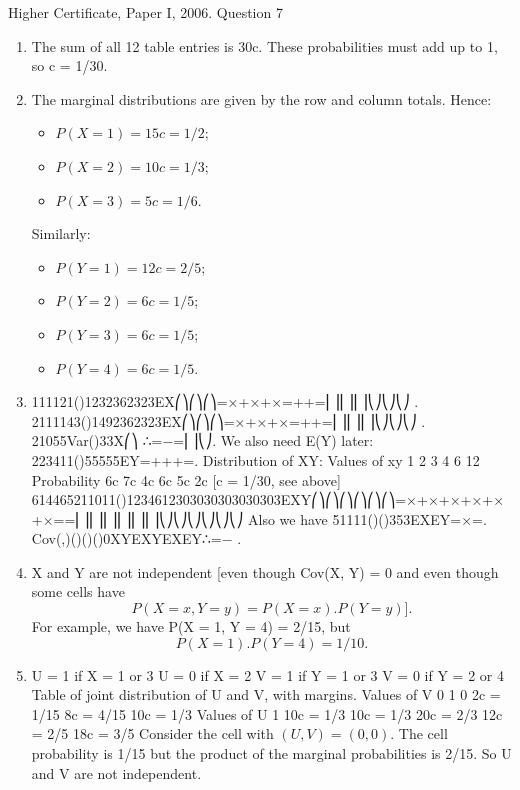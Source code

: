 \documentclass[a4paper,12pt]{article}
\begin{document}
Higher Certificate, Paper I, 2006. Question 7
\begin{enumerate}
\item  The sum of all 12 table entries is 30c. These probabilities must add up to 1, so c = 1/30.
\item  The marginal distributions are given by the row and column totals.
Hence:  
\begin{itemize}
\item $P(X = 1) = 15c = 1/2$; 
\item $P(X = 2) = 10c = 1/3$; 
\item $P(X = 3) = 5c = 1/6$.
\end{itemize}
Similarly: 
\begin{itemize}
\item $P(Y = 1) = 12c = 2/5$; 
\item $P(Y = 2) = 6c = 1/5$; 
\item $P(Y = 3) = 6c = 1/5$; 
\item $P(Y = 4) = 6c = 1/5$.
\end{itemize}
\item 111121()1232362323EX⎛⎞⎛⎞⎛⎞=×+×+×=++=⎜⎟⎜⎟⎜⎟⎝⎠⎝⎠⎝⎠ .
2111143()1492362323EX⎛⎞⎛⎞⎛⎞=×+×+×=++=⎜⎟⎜⎟⎜⎟⎝⎠⎝⎠⎝⎠ .
21055Var()33X⎛⎞ ∴=−=⎜⎟⎝⎠.
We also need E(Y) later: 223411()55555EY=+++=.
Distribution of XY:
Values of xy
1
2
3
4
6
12
Probability
6c
7c
4c
6c
5c
2c
[c = 1/30, see above]
614465211011()1234612303030303030303EXY⎛⎞⎛⎞⎛⎞⎛⎞⎛⎞⎛⎞=×+×+×+×+×+×==⎜⎟⎜⎟⎜⎟⎜⎟⎜⎟⎜⎟⎝⎠⎝⎠⎝⎠⎝⎠⎝⎠⎝⎠
Also we have 51111()()353EXEY=×=.
Cov(,)()()()0XYEXYEXEY∴=− .
\item  X and Y are not independent [even though Cov(X, Y) = 0 and even though some cells have 
\[P(X = x, Y = y) = P(X = x).P(Y = y)].\] 
For example, we have P(X = 1, Y = 4) = 2/15, but 
\[P(X = 1).P(Y = 4) = 1/10.\]
\item  U = 1 if X = 1 or 3 U = 0 if X = 2
V = 1 if Y = 1 or 3 V = 0 if Y = 2 or 4
Table of joint distribution of U and V, with margins.
Values of V
0
1
0
2c = 1/15
8c = 4/15
10c = 1/3
Values of U
1
10c = 1/3
10c = 1/3
20c = 2/3
12c = 2/5
18c = 3/5
Consider the cell with $(U, V) = (0, 0)$. The cell probability is 1/15 but the product of the marginal probabilities is 2/15. So U and V are not independent.
\end{enumerate}
\end{document}
